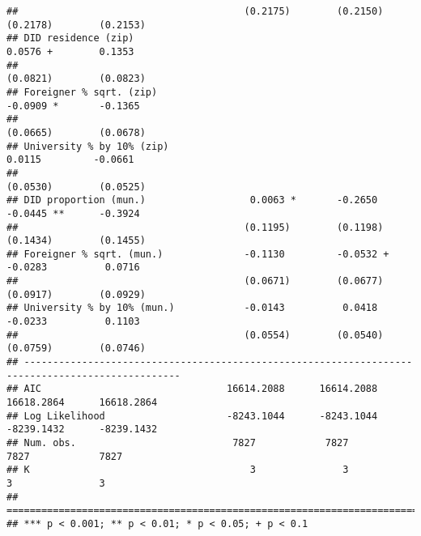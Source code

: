 \documentclass[
]{article}
\begin{document}
\begin{verbatim}
##                                       (0.2175)        (0.2150)        (0.2178)        (0.2153)   
## DID residence (zip)                                                    0.0576 +        0.1353    
##                                                                       (0.0821)        (0.0823)   
## Foreigner % sqrt. (zip)                                               -0.0909 *       -0.1365    
##                                                                       (0.0665)        (0.0678)   
## University % by 10% (zip)                                              0.0115         -0.0661    
##                                                                       (0.0530)        (0.0525)   
## DID proportion (mun.)                  0.0063 *       -0.2650         -0.0445 **      -0.3924    
##                                       (0.1195)        (0.1198)        (0.1434)        (0.1455)   
## Foreigner % sqrt. (mun.)              -0.1130         -0.0532 +       -0.0283          0.0716    
##                                       (0.0671)        (0.0677)        (0.0917)        (0.0929)   
## University % by 10% (mun.)            -0.0143          0.0418         -0.0233          0.1103    
##                                       (0.0554)        (0.0540)        (0.0759)        (0.0746)   
## -------------------------------------------------------------------------------------------------
## AIC                                16614.2088      16614.2088      16618.2864      16618.2864    
## Log Likelihood                     -8243.1044      -8243.1044      -8239.1432      -8239.1432    
## Num. obs.                           7827            7827            7827            7827         
## K                                      3               3               3               3         
## =================================================================================================
## *** p < 0.001; ** p < 0.01; * p < 0.05; + p < 0.1
\end{verbatim}
\end{document}
